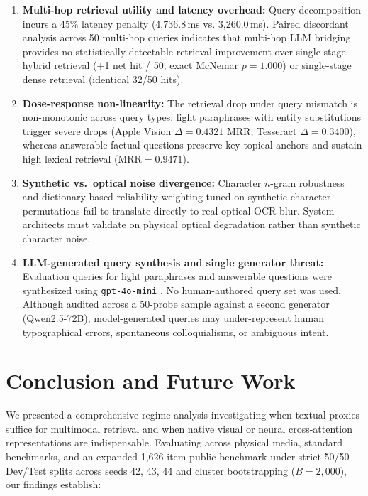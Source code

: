 \documentclass[conference]{IEEEtran}
\begin{document}
\begin{enumerate}
    \item \textbf{Multi-hop retrieval utility and latency overhead:} Query decomposition incurs a 45\% latency penalty (4,736.8\,ms vs. 3,260.0\,ms). Paired discordant analysis across 50 multi-hop queries indicates that multi-hop LLM bridging provides no statistically detectable retrieval improvement over single-stage hybrid retrieval (+1 net hit / 50; exact McNemar $p = 1.000$) or single-stage dense retrieval (identical 32/50 hits).
    \item \textbf{Dose-response non-linearity:} The retrieval drop under query mismatch is non-monotonic across query types: light paraphrases with entity substitutions trigger severe drops (Apple Vision $\Delta = 0.4321$ MRR; Tesseract $\Delta = 0.3400$), whereas answerable factual questions preserve key topical anchors and sustain high lexical retrieval ($\text{MRR} = 0.9471$).
    \item \textbf{Synthetic vs.\ optical noise divergence:} Character $n$-gram robustness and dictionary-based reliability weighting tuned on synthetic character permutations fail to translate directly to real optical OCR blur. System architects must validate on physical optical degradation rather than synthetic character noise.
    \item \textbf{LLM-generated query synthesis and single generator threat:} Evaluation queries for light paraphrases and answerable questions were synthesized using \texttt{gpt-4o-mini} \cite{openai2024gpt4o}. No human-authored query set was used. Although audited across a 50-probe sample against a second generator (Qwen2.5-72B), model-generated queries may under-represent human typographical errors, spontaneous colloquialisms, or ambiguous intent.
\end{enumerate}

\section{Conclusion and Future Work}
We presented a comprehensive regime analysis investigating when textual proxies suffice for multimodal retrieval and when native visual or neural cross-attention representations are indispensable. Evaluating across physical media, standard benchmarks, and an expanded 1,626-item public benchmark under strict 50/50 Dev/Test splits across seeds 42, 43, 44 and cluster bootstrapping ($B=2{,}000$), our findings establish:
\end{document}
